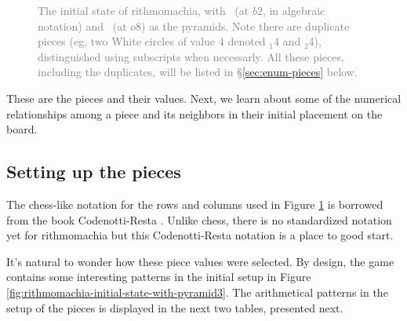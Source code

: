 \documentclass[14pt]{extarticle}
\begin{document}
\begin{center}
\begin{figure}[H]
\begin{tabular}{c|c|c|c|c|c|c|c|c|}
\end{tabular}
\newline
\caption{{\small{
      \textcolor{gray}{The initial state of rithmomachia, with \rhombus\, (at $b2$, in algebraic notation) and \rhombusfill\, 
        (at $o8$) as the pyramids.
        Note there are duplicate pieces (eg, two White circles of value $4$ denoted \circlet$_1$4 and \circlet$_2$4),
        distinguished using subscripts when necessarly. All these pieces, including the duplicates, will be listed in
      \S \ref{sec:enum-pieces} below.}
}}}
\label{fig:latex-table}
\end{figure}
\end{center}


These are the pieces and their values. 
Next, we learn about some of the numerical relationships among
a piece and its neighbors in their initial placement on the board.


\subsection{Setting up the pieces}
\label{sec:setup-pieces}


The chess-like notation for the rows and columns used in
Figure \ref{fig:latex-table} is borrowed from the book
Codenotti-Resta \cite{CR22}.
Unlike chess, there is no standardized notation yet for rithmomachia
but this Codenotti-Resta notation is a place to good start.

It's natural to wonder how these piece values were selected.
By design, the game contains some interesting patterns in the
initial setup in Figure \ref{fig:rithmomachia-initial-state-with-pyramid3}.
The arithmetical patterns in the setup of the pieces is displayed in the
next two tables, presented next.
\end{document}
